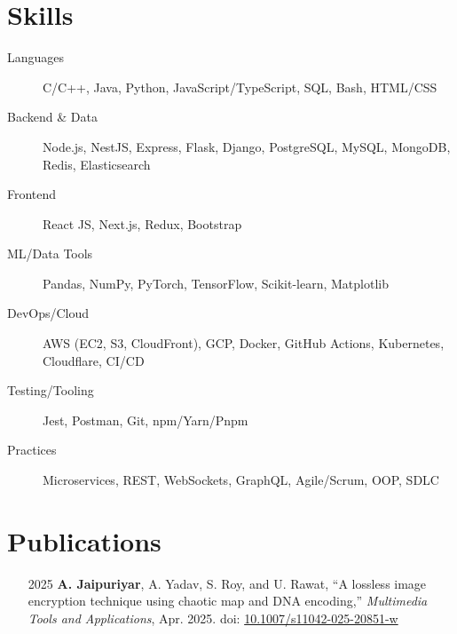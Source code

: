 \documentclass[letterpaper,11pt]{article}
\newcommand{\rside}[1]{
  \hfill {\small\color{accent} #1}%
}
\begin{document}
\section{Skills}
\begin{description}
  \item[Languages] C/C++, Java, Python, JavaScript/TypeScript, SQL, Bash, HTML/CSS
  \item[Backend \& Data] Node.js, NestJS, Express, Flask, Django, PostgreSQL, MySQL, MongoDB, Redis, Elasticsearch
  \item[Frontend] React JS, Next.js, Redux, Bootstrap
  \item[ML/Data Tools] Pandas, NumPy, PyTorch, TensorFlow, Scikit-learn, Matplotlib
  \item[DevOps/Cloud] AWS (EC2, S3, CloudFront), GCP, Docker, GitHub Actions, Kubernetes, Cloudflare, CI/CD
  \item[Testing/Tooling] Jest, Postman, Git, npm/Yarn/Pnpm
  \item[Practices] Microservices, REST, WebSockets, GraphQL, Agile/Scrum, OOP, SDLC
\end{description}


\section{Publications}
\begin{enumerate}
  \item [2025] \textbf{A. Jaipuriyar}, A. Yadav, S. Roy, and U. Rawat, “A lossless image encryption technique using chaotic map and DNA encoding,” \textit{Multimedia Tools and Applications}, Apr. 2025. doi: \href{https://doi.org/10.1007/s11042-025-20851-w}{10.1007/s11042-025-20851-w}
\end{enumerate}
\end{document}

